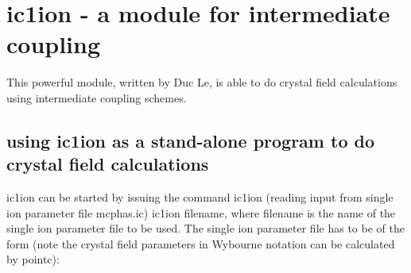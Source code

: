 \section{{\prg ic1ion} - a module for intermediate coupling}\label{ic1ion}


This powerful module, written by Duc Le, is able to do crystal field calculations
using intermediate coupling schemes. 

\subsection{using {\prg ic1ion} as a stand-alone program to do crystal field calculations}

{\prg ic1ion} can be started by issuing the command {\prg ic1ion} (reading input from single ion %
parameter file {\prg mcphas.ic}) 
{\prg ic1ion filename}, where {\prg filename} is the name of the single ion
parameter file to be used. The single ion 
parameter
file has to be of the form (note the crystal field parameters in Wybourne notation
can be calculated by {\prg pointc}):
